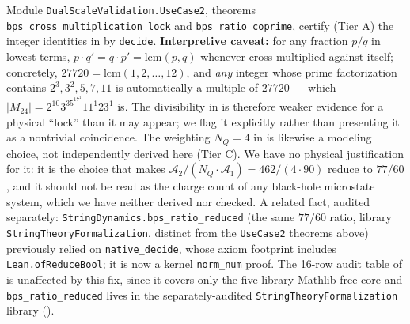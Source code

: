 \documentclass[11pt,a4paper]{article}
\theoremstyle{remark}
\begin{document}
\begin{scopebox}
Module \texttt{DualScaleValidation.UseCase2}, theorems \texttt{bps\_cross\_multiplication\_lock} and
\texttt{bps\_ratio\_coprime}, certify (Tier A) the integer identities in
 by \texttt{decide}. \textbf{Interpretive caveat:} for any
fraction $p/q$ in lowest terms,
$p\cdot q'=q\cdot p'=\mathrm{lcm}(p,q)$ whenever cross-multiplied against itself; concretely,
$27720=\mathrm{lcm}(1,2,\dots,12)$, and \emph{any} integer whose prime factorization contains
$2^3,3^2,5,7,11$ is automatically a multiple of $27720$ --- which $|M_{24}|=2^{10}3^35^17^{1}11^{1}23^{1}$
is. The divisibility in  is therefore weaker evidence for a physical ``lock''
than it may appear; we flag it explicitly rather than presenting it as a nontrivial coincidence. The
weighting $N_Q=4$ in  is likewise a modeling choice, not independently derived here
(Tier C). We have no physical justification for it: it is the choice that makes
$\mathcal A_2/(N_Q\cdot\mathcal A_1)=462/(4\cdot90)$ reduce to $77/60$, and it should not be read as the
charge count of any black-hole microstate system, which we have neither derived nor checked. A related fact, audited separately: \texttt{StringDynamics.\discretionary{}{}{}bps\_\discretionary{}{}{}ratio\_\discretionary{}{}{}reduced}
(the same $77/60$ ratio, library \texttt{StringTheoryFormalization}, distinct from the
\texttt{UseCase2} theorems above) previously relied on \texttt{native\_\discretionary{}{}{}decide},
whose axiom footprint includes \texttt{Lean.\discretionary{}{}{}ofReduceBool}; it is now a kernel
\texttt{norm\_\discretionary{}{}{}num} proof. The 16-row audit table of  is
unaffected by this fix, since it covers only the five-library Mathlib-free core and
\texttt{bps\_ratio\_reduced} lives in the separately-audited \texttt{StringTheoryFormalization}
library ().
\end{scopebox}
\end{document}
